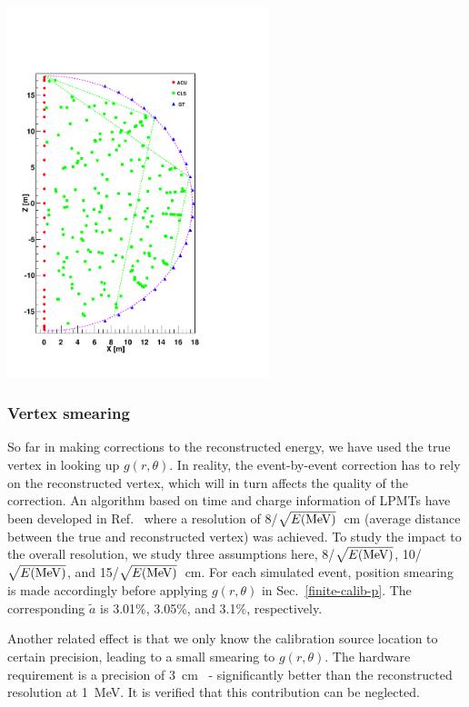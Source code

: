 \documentclass[a4paper,10pt,twoside]{cpc-hepnp}
\begin{document}
\begin{CJK*}{GB}{gbsn}
\begin{multicols}{2}
\begin{center}
  \centering
  \includegraphics[width=3in]{basic_coverage.pdf}
        \label{basic_coverage}
\end{center}

\subsubsection{Vertex smearing}
So far in making corrections to the reconstructed energy, we have used
the true vertex in looking up $g(r,\theta)$. In reality, the
event-by-event correction has to rely on the reconstructed vertex,
which will in turn affects the quality of the correction.  An
algorithm based on time and charge information of LPMTs have been
developed in Ref.~\cite{vertex-rec} where a resolution of
8/$\sqrt{E(\rm{MeV})}$~cm (average distance between the true and
reconstructed vertex) was achieved. To study the impact to the overall
resolution, we study three assumptions here, 8/$\sqrt{E(\rm{MeV})}$,
10/$\sqrt{E(\rm{MeV})}$, and 15/$\sqrt{E(\rm{MeV})}$~cm. For each
simulated event, position smearing is made accordingly before applying
$g(r,\theta)$ in Sec.~\ref{finite-calib-p}. The corresponding
$\tilde{a}$ is 3.01\%, 3.05\%, and 3.1\%, respectively.

Another related effect is that we only know the calibration source
location to certain precision, leading to a small smearing
to $g(r,\theta)$. The hardware requirement is a precision of
3~cm~\cite{JUNOCDR} - significantly better than the reconstructed
resolution at 1~MeV. It is verified that this contribution can be
neglected.


\end{multicols}
\end{CJK*}
\end{document}
